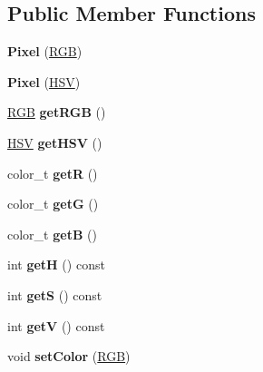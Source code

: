 \subsection*{Public Member Functions}
\begin{DoxyCompactItemize}
\item 
\hypertarget{classPixel_afe2eb7843df8e519d6abc8b9d4df9688}{}\label{classPixel_afe2eb7843df8e519d6abc8b9d4df9688} 
{\bfseries Pixel} (\hyperlink{structRGB}{R\+GB})
\item 
\hypertarget{classPixel_a5099935f8ed4a93fc04fe94e9897b721}{}\label{classPixel_a5099935f8ed4a93fc04fe94e9897b721} 
{\bfseries Pixel} (\hyperlink{structHSV}{H\+SV})
\item 
\hypertarget{classPixel_a123fe9b4701578656ce46429001ea301}{}\label{classPixel_a123fe9b4701578656ce46429001ea301} 
\hyperlink{structRGB}{R\+GB} {\bfseries get\+R\+GB} ()
\item 
\hypertarget{classPixel_adb6c4a94e33ac4029577ce7304ee43dc}{}\label{classPixel_adb6c4a94e33ac4029577ce7304ee43dc} 
\hyperlink{structHSV}{H\+SV} {\bfseries get\+H\+SV} ()
\item 
\hypertarget{classPixel_a6e0eb6c9581fbde8e13fd771ff88ada6}{}\label{classPixel_a6e0eb6c9581fbde8e13fd771ff88ada6} 
color\+\_\+t {\bfseries getR} ()
\item 
\hypertarget{classPixel_a69bf3cfda8d9543593764c9f2692ba26}{}\label{classPixel_a69bf3cfda8d9543593764c9f2692ba26} 
color\+\_\+t {\bfseries getG} ()
\item 
\hypertarget{classPixel_a4249cdc22eb5d95d89928f9f1640849e}{}\label{classPixel_a4249cdc22eb5d95d89928f9f1640849e} 
color\+\_\+t {\bfseries getB} ()
\item 
\hypertarget{classPixel_ab2a622b2533c857b396dc6ff0e4894c8}{}\label{classPixel_ab2a622b2533c857b396dc6ff0e4894c8} 
int {\bfseries getH} () const
\item 
\hypertarget{classPixel_ae5cdc463e1ecaed891cfa18c131700e3}{}\label{classPixel_ae5cdc463e1ecaed891cfa18c131700e3} 
int {\bfseries getS} () const
\item 
\hypertarget{classPixel_a6d76a94b02bccb393fd07dc9cfc54131}{}\label{classPixel_a6d76a94b02bccb393fd07dc9cfc54131} 
int {\bfseries getV} () const
\item 
\hypertarget{classPixel_a3a632ce38ad1a93a65406114f08cd628}{}\label{classPixel_a3a632ce38ad1a93a65406114f08cd628} 
void {\bfseries set\+Color} (\hyperlink{structRGB}{R\+GB})
\item 
\hypertarget{classPixel_a1d004a491b2c5ee95880a70d7cf21b86}{}\label{classPixel_a1d004a491b2c5ee95880a70d7cf21b86} 

\end{DoxyCompactItemize}
